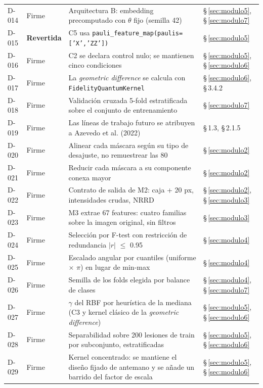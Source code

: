 \begin{longtable}{@{}llp{8.4cm}p{3.0cm}@{}}
D-014 & Firme & Arquitectura B: embedding precomputado con $\theta$ fijo (semilla 42) & \S\,\ref{sec:modulo5}, \S\,\ref{sec:modulo7} \\
D-015 & \textbf{Revertida} & C5 usa \texttt{pauli\_feature\_map(paulis=['X','ZZ'])} & \S\,\ref{sec:modulo5} \\
D-016 & Firme & C2 se declara control nulo; se mantienen cinco condiciones & \S\,\ref{sec:modulo5}, \S\,\ref{sec:modulo6} \\
D-017 & Firme & La \textit{geometric difference} se calcula con \texttt{FidelityQuantumKernel} & \S\,\ref{sec:modulo6}, \S\,3.4.2 \\
D-018 & Firme & Validación cruzada 5-fold estratificada sobre el conjunto de entrenamiento & \S\,\ref{sec:modulo7} \\
D-019 & Firme & Las líneas de trabajo futuro se atribuyen a Azevedo et al. (2022) & \S\,1.3, \S\,2.1.5 \\
D-020 & Firme & Alinear cada máscara según su tipo de desajuste, no remuestrear las 80 & \S\,\ref{sec:modulo2} \\
D-021 & Firme & Reducir cada máscara a su componente conexa mayor & \S\,\ref{sec:modulo2} \\
D-022 & Firme & Contrato de salida de M2: caja + 20 px, intensidades crudas, NRRD & \S\,\ref{sec:modulo2}, \S\,\ref{sec:modulo3} \\
D-023 & Firme & M3 extrae 67 features: cuatro familias sobre la imagen original, sin filtros & \S\,\ref{sec:modulo3} \\
D-024 & Firme & Selección por F-test con restricción de redundancia $|r|$ $\le$ 0.95 & \S\,\ref{sec:modulo4} \\
D-025 & Firme & Escalado angular por cuantiles (uniforme $\times$ $\pi$) en lugar de min-max & \S\,\ref{sec:modulo4} \\
D-026 & Firme & Semilla de los folds elegida por balance de clases & \S\,\ref{sec:modulo4}, \S\,\ref{sec:modulo7} \\
D-027 & Firme & $\gamma$ del RBF por heurística de la mediana (C3 y kernel clásico de la \textit{geometric difference}) & \S\,\ref{sec:modulo5}, \S\,\ref{sec:modulo6} \\
D-028 & Firme & Separabilidad sobre 200 lesiones de train por subconjunto, estratificadas & \S\,\ref{sec:modulo5}, \S\,\ref{sec:modulo6} \\
D-029 & Firme & Kernel concentrado: se mantiene el diseño fijado de antemano y se añade un barrido del factor de escala & \S\,\ref{sec:modulo5}, \S\,\ref{sec:modulo6} \\

\end{longtable}
